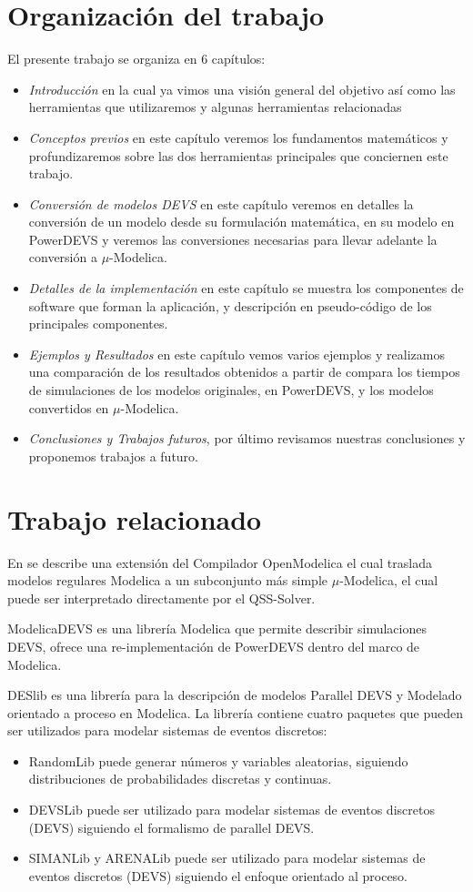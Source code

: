 \section{Organización del trabajo}
El presente trabajo se organiza en 6 capítulos:
\begin{itemize}
\item \emph{Introducción} en la cual ya vimos una visión general del objetivo así como las herramientas que utilizaremos y algunas herramientas relacionadas
\item \emph{Conceptos previos} en este capítulo veremos los fundamentos matemáticos y profundizaremos sobre las dos herramientas principales que conciernen este trabajo.
\item \emph{Conversión de modelos DEVS} en este capítulo veremos en detalles la conversión de un modelo desde su formulación matemática, en su modelo en PowerDEVS y veremos las conversiones necesarias para llevar adelante la conversión a $\mu$-Modelica.
\item \emph{Detalles de la implementación} en este capítulo se muestra los componentes de software que forman la aplicación, y descripción en pseudo-código de los principales componentes.
\item \emph{Ejemplos y Resultados} en este capítulo vemos varios ejemplos y realizamos una comparación de los resultados obtenidos a partir de compara los tiempos de simulaciones de los modelos originales, en PowerDEVS, y los modelos convertidos en $\mu$-Modelica.
\item \emph{Conclusiones y Trabajos futuros}, por último revisamos nuestras conclusiones y proponemos trabajos a futuro.
\end{itemize}

\section{Trabajo relacionado}
En \cite{Ber12} se describe una extensión del Compilador OpenModelica el cual traslada modelos regulares Modelica a un subconjunto más simple $\mu$-Modelica, el cual puede ser interpretado directamente por el QSS-Solver.


ModelicaDEVS \cite{Beltrame06quantisedstate} es una librería Modelica que permite describir simulaciones DEVS, ofrece una re-implementación de PowerDEVS dentro del marco de Modelica.

DESlib \cite{Sanz09paralleldevs} es una librería para la descripción de modelos Parallel DEVS y Modelado orientado a proceso en Modelica.
La librería contiene cuatro paquetes que pueden ser utilizados para modelar sistemas de eventos discretos:
\begin{itemize}
\item RandomLib puede generar números y variables aleatorias, siguiendo distribuciones de probabilidades discretas y continuas.
\item DEVSLib puede ser utilizado para modelar sistemas de eventos discretos (DEVS) siguiendo el formalismo de parallel DEVS.
\item SIMANLib y ARENALib puede ser utilizado para modelar sistemas de eventos discretos (DEVS) siguiendo el enfoque orientado al proceso.
\end{itemize}


